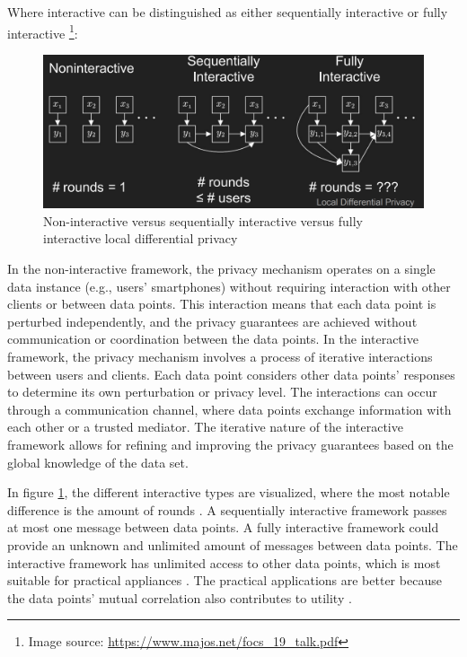 Where interactive can be distinguished as either sequentially interactive or fully interactive \footnote{Image source: \url{https://www.majos.net/focs_19_talk.pdf}}:
\begin{figure}[H]
  \includegraphics[width=\textwidth]{TheorethicalFramework/nont-interactive-versus-interactive.png}
  \caption{Non-interactive versus sequentially interactive versus fully interactive local differential privacy \citep{joseph_role_2019-1}}
  \label{fig:non-interactive-versus-interactive}
\end{figure}
In the non-interactive framework, the privacy mechanism operates on a single data instance (e.g., users’ smartphones) without requiring interaction with other clients or between data points.
This interaction means that each data point is perturbed independently, and the privacy guarantees are achieved without communication or coordination between the data points.
In the interactive framework, the privacy mechanism involves a process of iterative interactions between users and clients.
Each data point considers other data points' responses to determine its own perturbation or privacy level.
The interactions can occur through a communication channel, where data points exchange information with each other or a trusted mediator.
The iterative nature of the interactive framework allows for refining and improving the privacy guarantees based on the global knowledge of the data set.

In figure \ref{fig:non-interactive-versus-interactive}, the different interactive types are visualized, where the most notable difference is the amount of rounds \citep{xiongComprehensiveSurveyLocal2020}.
A sequentially interactive framework passes at most one message between data points.
A fully interactive framework could provide an unknown and unlimited amount of messages between data points.
The interactive framework has unlimited access to other data points, which is most suitable for practical appliances \citep{xiongComprehensiveSurveyLocal2020}.
The practical applications are better because the data points' mutual correlation also contributes to utility \citep{wang_comprehensive_2020}.

